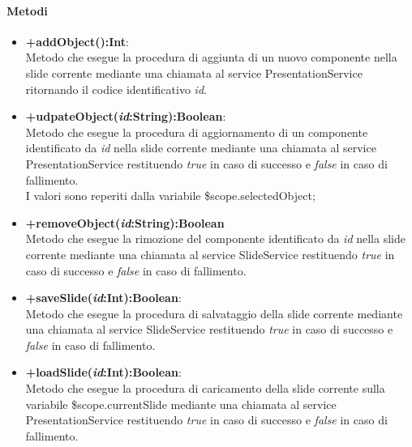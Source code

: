 	\paragraph{Metodi}
	\begin{itemize}
	  \item \textbf{+addObject():Int}:\\
		 Metodo che esegue la procedura di aggiunta di un nuovo componente nella slide corrente mediante una chiamata al service PresentationService ritornando il codice identificativo \textit{id}.
	  \item \textbf{+udpateObject(\textit{id}:String):Boolean}:\\
		 Metodo che esegue la procedura di aggiornamento di un componente  identificato da \textit{id} nella slide corrente mediante una chiamata al service PresentationService  restituendo \textit{true} in caso di successo e \textit{false} in caso di fallimento.\\I valori sono reperiti dalla variabile \$scope.selectedObject;
	  \item \textbf{+removeObject(\textit{id}:String):Boolean}\\
		 Metodo che esegue la rimozione del componente identificato da \textit{id} nella slide corrente mediante una chiamata al service SlideService  restituendo \textit{true} in caso di successo e \textit{false} in caso di fallimento.
	  \item \textbf{+saveSlide(\textit{id}:Int):Boolean}:\\
		 Metodo che esegue la procedura di salvataggio della slide corrente mediante una chiamata al service SlideService restituendo \textit{true} in caso di successo e \textit{false} in caso di fallimento.
	  \item \textbf{+loadSlide(\textit{id}:Int):Boolean}:\\
		 Metodo che esegue la procedura di caricamento della slide corrente sulla variabile \$scope.currentSlide mediante una chiamata al service PresentationService restituendo \textit{true} in caso di successo e \textit{false} in caso di fallimento.
	  	  
	\end{itemize}
